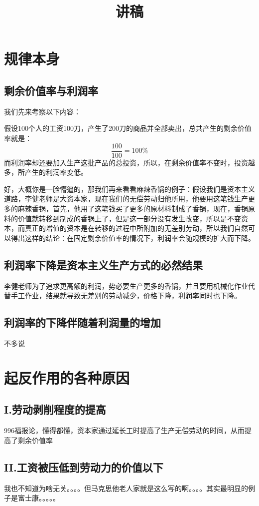 \documentclass[utf8]{ctexart}
\title{讲稿}
\author{}
\date{}
\begin{document}
	\maketitle
	\section{规律本身}
	\subsection{剩余价值率与利润率}
	我们先来考察以下内容：
	
	假设100个人的工资100刀，产生了200刀的商品并全部卖出，总共产生的剩余价值率就是：$$\frac{100}{100}=100\%$$而利润率却还要加入生产这批产品的总投资，所以，在剩余价值率不变时，投资越多，所产生的利润率变低。
	
	好，大概你是一脸懵逼的，那我们再来看看麻辣香锅的例子：假设我们是资本主义道路，李健老师是大资本家，现在我们的无偿劳动归他所用，他要用这笔钱生产更多的麻辣香锅，首先，他用了这笔钱买了更多的原材料制成了香锅，现在，香锅原料的价值就转移到制成的香锅上了，但是这一部分没有发生改变，所以是不变资本，而真正的增值的资本是在转移的过程中所附加的无差别劳动，所以我们自然可以得出这样的结论：在固定剩余价值率的情况下，利润率会随规模的扩大而下降。
	\subsection{利润率下降是资本主义生产方式的必然结果}
	李健老师为了追求更高额的利润，势必要生产更多的香锅，并且要用机械化作业代替手工作业，结果就导致无差别的劳动减少，价格下降，利润率同时也下降。
	
	\subsection{利润率的下降伴随着利润量的增加}
	不多说
	\section{起反作用的各种原因}
	\subsection{I.劳动剥削程度的提高}
	996福报论，懂得都懂，资本家通过延长工时提高了生产无偿劳动的时间，从而提高了剩余价值率
	\subsection{II.工资被压低到劳动力的价值以下}
	我也不知道为啥无关。。。。但马克思他老人家就是这么写的啊。。。。其实最明显的例子是富士康。。。。。
\end{document}
